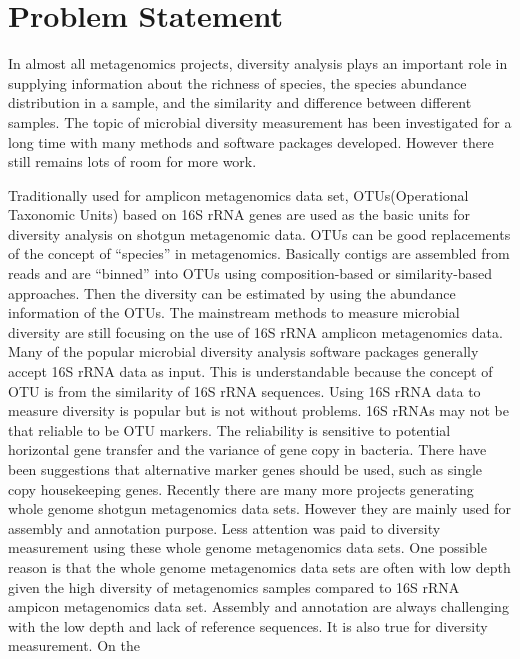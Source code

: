 \section{Problem Statement}


In almost all  metagenomics projects, diversity analysis plays an important
role in supplying information about the richness of species, the species
abundance distribution in a sample, and the similarity and difference between
different samples. The topic of microbial diversity measurement has been
investigated for a long time with many methods and software packages developed.
However there still remains lots of room for more work.


Traditionally used for amplicon metagenomics data set, OTUs(Operational
Taxonomic Units) based on 16S rRNA genes are used as the basic units for
diversity analysis on shotgun metagenomic data. OTUs can be good replacements
of the concept of ``species'' in metagenomics. Basically contigs are assembled
from reads and are ``binned'' into OTUs using composition-based or
similarity-based approaches. Then the diversity can be estimated by using the
abundance information of the OTUs. The mainstream methods to measure microbial
diversity are still focusing on the use of 16S rRNA amplicon metagenomics data.
Many of the popular microbial diversity analysis software packages generally
accept 16S rRNA data as input. This is understandable because the concept of
OTU is from the similarity of 16S rRNA sequences. Using 16S rRNA data to
measure diversity is popular but is not without problems. 16S rRNAs may not be
that reliable to be OTU markers. The reliability is sensitive to potential
horizontal gene transfer and the variance of gene copy in bacteria. There have
been suggestions that alternative marker genes should be used, such as single
copy housekeeping genes.
% 
Recently there are many more projects generating whole genome shotgun
metagenomics data sets. However they are mainly used for assembly and
annotation purpose. Less attention was paid to diversity measurement using
these whole genome metagenomics data sets. One possible reason is that the
whole genome metagenomics data sets are often with low depth given the high
diversity of metagenomics samples compared to 16S rRNA ampicon metagenomics
data set. Assembly and annotation are always challenging with the low depth and
lack of reference sequences. It is also true for diversity measurement. On the
